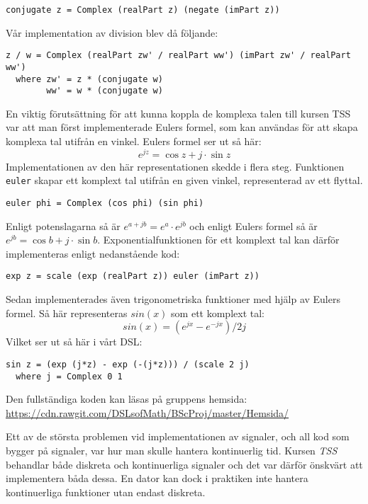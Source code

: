 \documentclass[]{article}
\begin{document}
\begin{verbatim}
conjugate z = Complex (realPart z) (negate (imPart z))
\end{verbatim}
Vår implementation av division blev då följande:
\begin{verbatim}
z / w = Complex (realPart zw' / realPart ww') (imPart zw' / realPart ww')
  where zw' = z * (conjugate w)
        ww' = w * (conjugate w)
\end{verbatim}

En viktig förutsättning för att kunna koppla de komplexa talen till kursen TSS var att man först
implementerade Eulers formel, som kan användas för att skapa komplexa tal utifrån en vinkel. Eulers
formel ser ut så här:
\[e^{jz}=\cos z+ j \cdot \sin z \]
Implementationen av den här representationen skedde i flera steg.
Funktionen \texttt{euler} skapar ett komplext tal utifrån en
given vinkel, representerad av ett flyttal.
\begin{verbatim}
euler phi = Complex (cos phi) (sin phi)
\end{verbatim}
Enligt potenslagarna%
så är \(e^{a+jb} = e^{a} \cdot e^{jb}\) och enligt Eulers formel så är
\(e^{j b} = \cos b + j\cdot \sin b\).
%
Exponentialfunktionen för ett komplext tal kan därför implementeras
enligt nedanstående kod:

\begin{verbatim}
exp z = scale (exp (realPart z)) euler (imPart z))
\end{verbatim}
Sedan implementerades även trigonometriska funktioner med hjälp av Eulers
formel. Så här representeras $sin(x)$ som ett komplext tal:
\[ sin(x) = (e^{j x} - e^{-j x}) / 2 j \]
Vilket ser ut så här i vårt DSL:
\begin{verbatim}
sin z = (exp (j*z) - exp (-(j*z))) / (scale 2 j)
  where j = Complex 0 1
\end{verbatim}

Den fullständiga koden kan läsas på gruppens hemsida:
\url{https://cdn.rawgit.com/DSLsofMath/BScProj/master/Hemsida/}

Ett av de största problemen vid implementationen av signaler, och all kod som bygger på signaler, var hur man
skulle hantera kontinuerlig tid. Kursen \textit{TSS} behandlar både diskreta och kontinuerliga signaler och det var
därför önskvärt att implementera båda dessa. En dator kan dock i praktiken inte hantera kontinuerliga funktioner utan
endast diskreta.
\end{document}

